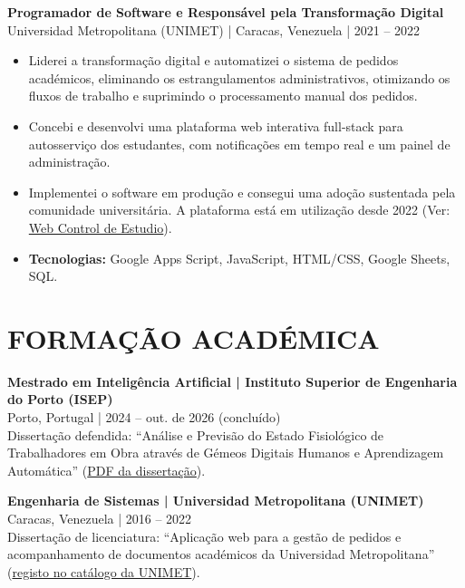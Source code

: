 \documentclass[10pt,a4paper]{article}
\begin{document}
\par\addvspace{\baselineskip}
\textbf{\large Programador de Software e Responsável pela Transformação Digital}\\
Universidad Metropolitana (UNIMET) | Caracas, Venezuela | 2021 -- 2022
\begin{itemize}
    \item Liderei a transformação digital e automatizei o sistema de pedidos académicos, eliminando os estrangulamentos administrativos, otimizando os fluxos de trabalho e suprimindo o processamento manual dos pedidos.
    \item Concebi e desenvolvi uma plataforma web interativa full-stack para autosserviço dos estudantes, com notificações em tempo real e um painel de administração.
    \item Implementei o software em produção e consegui uma adoção sustentada pela comunidade universitária. A plataforma está em utilização desde 2022 (Ver: \href{https://script.google.com/macros/s/AKfycbw3h26r_mjt0jow79RT9dnPaUKZ81dVUsF8qDeEjp7wsRg-ldqHjlB9L0FJYP_Uc_LXUw/exec}{Web Control de Estudio}).
    \item \textbf{Tecnologias:} Google Apps Script, JavaScript, HTML/CSS, Google Sheets, SQL.
\end{itemize}

\section*{FORMAÇÃO ACADÉMICA}

\textbf{Mestrado em Inteligência Artificial | Instituto Superior de Engenharia do Porto (ISEP)}\\
Porto, Portugal | 2024 -- out. de 2026 (concluído)\\
Dissertação defendida: ``Análise e Previsão do Estado Fisiológico de Trabalhadores em Obra através de Gémeos Digitais Humanos e Aprendizagem Automática'' (\href{https://drive.google.com/file/d/1xlqiDRtNX2Xj5_9TnHy6inUlAnseSHbF/view?usp=drive\_link}{PDF da dissertação}).

\textbf{Engenharia de Sistemas | Universidad Metropolitana (UNIMET)}\\
Caracas, Venezuela | 2016 -- 2022\\
Dissertação de licenciatura: ``Aplicação web para a gestão de pedidos e acompanhamento de documentos académicos da Universidad Metropolitana'' (\href{https://unimet.ent.sirsi.net/client/es_ES/default/search/detailnonmodal/ent:\%24002f\%24002fSD\_ILS\%24002f0\%24002fSD\_ILS:132264/one}{registo no catálogo da UNIMET}).
\end{document}
